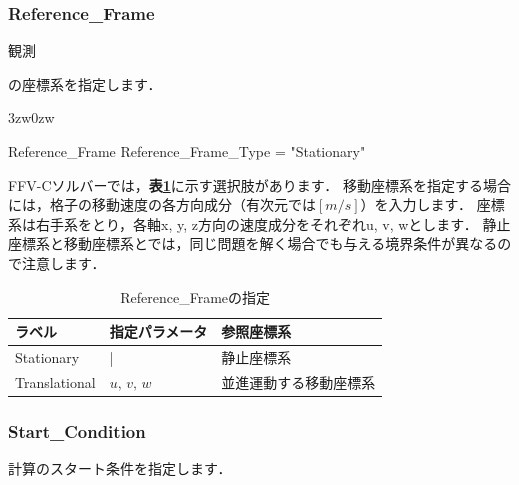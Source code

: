 \pagebreak
\subsubsection{Reference\_Frame}

\hypertarget{tgt:reference_frame}{観測}の座標系を指定します．

\begin{indentation}{3zw}{0zw}
\small

\begin{program}
  Reference_Frame {
    Reference_Frame_Type = "Stationary"
  }

\end{program}

\normalsize
FFV-Cソルバーでは，\textbf{表\ref{tbl:ref_frame}}に示す選択肢があります．
移動座標系を指定する場合には，格子の移動速度の各方向成分（有次元では$[m/s]$）を入力します．
座標系は右手系をとり，各軸x, y, z方向の速度成分をそれぞれu, v, wとします．
静止座標系と移動座標系とでは，同じ問題を解く場合でも与える境界条件が異なるので注意します．

\begin{table}[htdp]
\caption{Reference\_Frameの指定}
\begin{center}
\small
\begin{tabular}{lll} \toprule
ラベル & 指定パラメータ & 参照座標系\\ \midrule
Stationary & | & 静止座標系\\
Translational & $u,\,v,\,w$ & 並進運動する移動座標系\\ \bottomrule
\end{tabular}
\end{center}
\label{tbl:ref_frame}
\end{table}

\end{indentation}



\pagebreak
\subsubsection{Start\_Condition}

計算の\hypertarget{tgt:start_condition}{スタート条件}を指定します．

